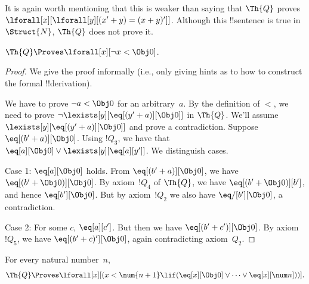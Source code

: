 \documentclass[../../../include/open-logic-section]{subfiles}
\begin{document}
It is again worth mentioning that this is weaker than saying that
$\Th{Q}$ proves $\lforall[x][\lforall[y][(x' + y) = (x + y)']]$.
Although this !!{sentence} is true in~$\Struct{N}$, $\Th{Q}$ does not
prove it.

\begin{lem}
$\Th{Q} \Proves \lforall[x][\lnot x < \Obj 0]$.
\end{lem}

\begin{proof}
We give the proof informally (i.e., only giving hints as to
how to construct the formal !!{derivation}).

We have to prove $\lnot a < \Obj 0$ for an arbitrary~$a$. By the
definition of $<$, we need to prove $\lnot
\lexists[y][\eq[(y'+a)][\Obj 0]]$ in $\Th{Q}$. We'll assume
$\lexists[y][\eq[(y'+a)][\Obj 0]]$ and prove a contradiction. Suppose
$\eq[(b'+a)][\Obj 0]$. Using $!Q_3$, we
have that $\eq[a][\Obj 0] \lor \lexists[y][\eq[a][y']]$. We
distinguish cases. 

Case 1: $\eq[a][\Obj 0]$ holds. From $\eq[(b'+a)][\Obj 0]$, we have
$\eq[(b' + \Obj 0)][\Obj 0]$. By axiom~$!Q_4$ of $\Th{Q}$, we have
$\eq[(b' + \Obj 0)][b']$, and hence $\eq[b'][\Obj 0]$. But by
axiom~$!Q_2$ we also have $\eq/[b'][\Obj 0]$, a contradiction. 

Case 2: For some $c$, $\eq[a][c']$. But then we have $\eq[(b' +
c')][\Obj 0]$. By axiom~$!Q_5$, we have $\eq[(b' + c)'][\Obj 0]$, again
contradicting axiom~$Q_2$.
\end{proof}

\begin{lem}
For every natural number~$n$, 
  \[
  \Th{Q} \Proves
  \lforall[x][(x < \num {n+1} \lif (\eq[x][\Obj 0] \lor \dots \lor
    \eq[x][\num n]))].
  \]
\end{lem}
\end{document}

